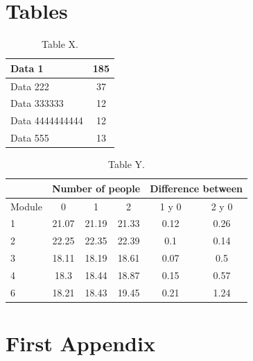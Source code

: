 \documentclass{article} %
\begin{document}
\section{Tables}

\begin{table}[H]
    \centering
    \begin{tabular}{||l | c ||}
        \hline
        \hline
        Data 1 & 185\\
        \hline
        Data 222 & 37\\
        \hline
        Data 333333 & 12\\
        \hline
        Data 4444444444 & 12\\
        \hline
        Data 555 & 13\\
        \hline
        \hline
    \end{tabular}
    \caption{Table X.}
    \label{tab:table-x}
\end{table}

\begin{table}[H]
    \centering
    \begin{tabular}{||l || c | c | c | c | c ||}
        \hline
        \hline
        & \multicolumn{3}{c|}{Number of people} & \multicolumn{2}{c||}{Difference between}\\
        \hline
        Module & 0 & 1 & 2 & 1 y 0 & 2 y 0\\
        \hline            
        \hline
        1 & 21.07 & 21.19 & 21.33 & 0.12 & 0.26\\
        \hline
        2 & 22.25 & 22.35 & 22.39 & 0.1 & 0.14\\
        \hline
         3 & 18.11 & 18.19 & 18.61 & 0.07 & 0.5\\
        \hline
        4 & 18.3 & 18.44 & 18.87 & 0.15 & 0.57\\
        \hline
        6 & 18.21 & 18.43 & 19.45 & 0.21 & 1.24\\
        \hline
        \hline
    \end{tabular}
    \caption{Table Y.}
    \label{tab:table-y}
\end{table}

\cleardoublepage

\appendix
\clearpage
\addappheadtotoc
\appendixpage

\section{First Appendix}\label{app:one}
\end{document}
